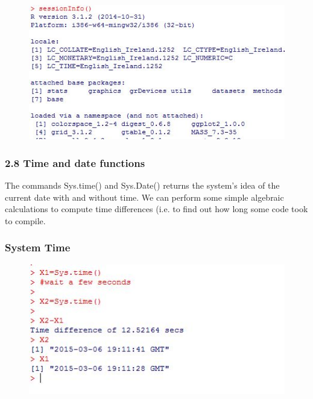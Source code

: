 \documentclass{beamer}
\begin{document}
 \begin{frame}
 	
 	\begin{figure}
 		\centering
 		\includegraphics[width=0.99\linewidth]{images/sessionInfo}
 		\caption{}
 		\label{fig:sessionInfo}
 	\end{figure}
 \end{frame}	
 	\begin{frame}
 		\frametitle{2.8 Time and date functions}
 		The commands Sys.time() and Sys.Date() returns the system’s idea of the current date
 		with and without time. We can perform some simple algebraic calculations to compute time
 		differences (i.e. to find out how long some code took to compile.
 		
 	\end{frame}
 	\begin{frame}
 		\frametitle{System Time}
 		\begin{figure}
 			\centering
 			\includegraphics[width=0.7\linewidth]{images/Systime}
 			\caption{}
 			\label{fig:Systime}
 		\end{figure}
 		
 	\end{frame}
\end{document}
